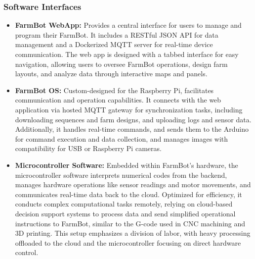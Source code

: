 \subsubsection{Software Interfaces}
\begin{itemize}
    \item \textbf{FarmBot WebApp:} Provides a central interface for users to manage and program their FarmBot. It includes a RESTful JSON API for data management and a Dockerized MQTT server for real-time device communication. The web app is designed with a tabbed interface for easy navigation, allowing users to oversee FarmBot operations, design farm layouts, and analyze data through interactive maps and panels.
    \item \textbf{FarmBot OS:} Custom-designed for the Raspberry Pi, facilitates communication and operation capabilities. It connects with the web application via hosted MQTT gateway for synchronization tasks, including downloading sequences and farm designs, and uploading logs and sensor data. Additionally, it handles real-time commands, and sends them to the Arduino for command execution and data collection, and manages images with compatibility for USB or Raspberry Pi cameras.
    \item \textbf{Microcontroller Software:} Embedded within FarmBot's hardware, the microcontroller software interprets numerical codes from the backend, manages hardware operations like sensor readings and motor movements, and communicates real-time data back to the cloud. Optimized for efficiency, it conducts complex computational tasks remotely, relying on cloud-based decision support systems to process data and send simplified operational instructions to FarmBot, similar to the G-code used in CNC machining and 3D printing. This setup emphasizes a division of labor, with heavy processing offloaded to the cloud and the microcontroller focusing on direct hardware control.
\end{itemize}

